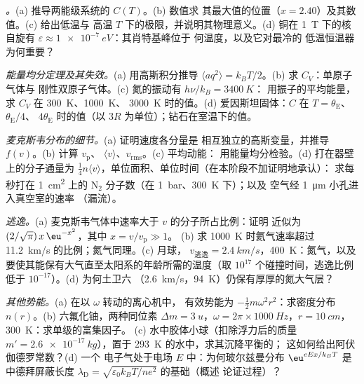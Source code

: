 \begin{exercise}[$\star\star$]\label{exo:b2:boltzmann-factor:6}
\emph{。}(a) 推导两能级系统的 $C(T)$。(b) 数值求
其最大值的位置（$x = 2.40$）及其数值。(c) 给出低温与
高温 $T$ 下的极限，并说明其物理意义。(d) 铜在
\qty{1}{T} 下的核自旋有 $\varepsilon \approx \qty{1e-7}{eV}$：其肖特基峰位于
何温度，以及它对最冷的
低温恒温器为何重要？
\end{exercise}

\begin{exercise}[$\star\star$]\label{exo:b2:boltzmann-factor:7}
\emph{能量均分定理及其失效。}(a) 用高斯积分推导 $\langle aq^2\rangle =
k_BT/2$。(b) 求 $C_V$：单原子气体与
刚性双原子气体。(c) 氮的振动有 $h\nu/k_B = \qty{3400}{K}$：
用振子的平均能量，求 $C_V$ 在 \qty{300}{K}、\qty{1000}{K}、
\qty{3000}{K} 时的值。(d) 爱因斯坦固体：$C$ 在 $T = \theta_{\text{E}}$、$\theta_{\text{E}}/4$、
$4\theta_{\text{E}}$ 时的值（以 $3R$ 为单位）；钻石在室温下的值。
\end{exercise}

\begin{exercise}[$\star\star$]\label{exo:b2:boltzmann-factor:8}
\emph{麦克斯韦分布的细节。}(a) 证明速度各分量是
相互独立的高斯变量，并推导 $f(v)$。(b) 计算 $v_{\text{p}}$、
$\langle v\rangle$、$v_{\text{rms}}$。(c) 平均动能：
用能量均分检验。(d) 打在器壁上的分子通量为
$\tfrac14n\langle v\rangle$，单位面积、单位时间（在本阶段不加证明地承认）：
求每秒打在 \qty{1}{cm^2} 上的 N$_2$ 分子数（在 \qty{1}{bar}、\qty{300}{K} 下）；以及
空气经 \qty{1}{\micro m} 小孔进入真空室的速率
（漏流）。
\end{exercise}

\begin{exercise}[$\star\star$]\label{exo:b2:boltzmann-factor:9}
\emph{逃逸。}(a) 麦克斯韦气体中速率大于 $v$ 的分子所占比例：证明
近似为 $(2/\sqrt\pi)\,x\,\eu^{-x^2}$，其中 $x = v/v_{\text{p}} \gg 1$。
(b) 求 \qty{1000}{K} 时氦气速率超过 \qty{11.2}{km/s} 的比例；氮气同理。(c) 月球，
$v_{\text{逃逸}} = \qty{2.4}{km/s}$，\qty{400}{K}：氮气，以及
要使其能保有大气直至太阳系的年龄所需的温度（取 $10^{17}$
个碰撞时间，逃逸比例低于 $10^{-17}$）。(d) 为何土卫六
（\qty{2.6}{km/s}，\qty{94}{K}）仍保有厚厚的氮大气层？
\end{exercise}

\begin{exercise}[$\star\star\star$]\label{exo:b2:boltzmann-factor:10}
\emph{其他势能。}(a) 在以 $\omega$ 转动的离心机中，
有效势能为 $-\tfrac12m\omega^2r^2$：求密度分布
$n(r)$。(b) 六氟化铀，两种同位素 $\Delta m = \qty{3}{u}$，$\omega
= 2\pi \times \qty{1000}{Hz}$，$r = \qty{10}{cm}$，\qty{300}{K}：求单级的富集因子。
(c) 水中胶体小球（扣除浮力后的质量 $m' =
\qty{2.6e-17}{kg}$），置于 \qty{293}{K} 的水中，求其沉降平衡的；
这如何给出阿伏伽德罗常数？(d) 一个
电子气处于电场 $E$ 中：为何玻尔兹曼分布
$\eu^{eEx/k_BT}$ 是
中德拜屏蔽长度 $\lambda_{\text{D}} = \sqrt{\varepsilon_0k_BT/ne^2}$ 的基础（概述
论证过程）？
\end{exercise}


